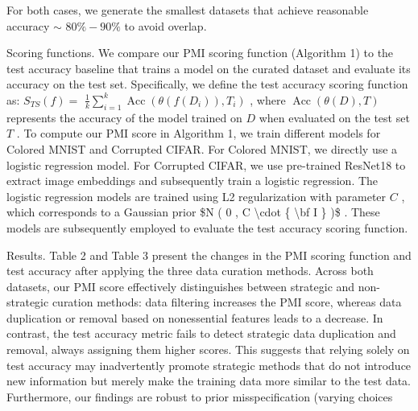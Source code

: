 For both cases, we generate the smallest datasets that achieve
reasonable accuracy \(\sim\) \(8 0 \% - 9 0 \%\) to avoid overlap.

Scoring functions. We compare our PMI scoring function (Algorithm 1) to
the test accuracy baseline that trains a model on the curated dataset
and evaluate its accuracy on the test set. Specifically, we define the
test accuracy scoring function as: \(S _ { T S } ( f ) =\)
\({ \frac { 1 } { k } } \sum _ { i = 1 } ^ { k } \operatorname { A c c } ( \theta ( f ( D _ { i } ) ) , T _ { i } )\)
, where \(\operatorname { A c c } ( \theta ( D ) , T )\) represents the
accuracy of the model trained on \(D\) when evaluated on the test set
\(T\) . To compute our PMI score in Algorithm 1, we train different
models for Colored MNIST and Corrupted CIFAR. For Colored MNIST, we
directly use a logistic regression model. For Corrupted CIFAR, we use
pre-trained ResNet18 to extract image embeddings and subsequently train
a logistic regression. The logistic regression models are trained using
L2 regularization with parameter \(C\) , which corresponds to a Gaussian
prior {\$N ( 0 , C \textbackslash cdot \{ \textbackslash bf I \} )\$} .
These models are subsequently employed to evaluate the test accuracy
scoring function.

Results. Table 2 and Table 3 present the changes in the PMI scoring
function and test accuracy after applying the three data curation
methods. Across both datasets, our PMI score effectively distinguishes
between strategic and non-strategic curation methods: data filtering
increases the PMI score, whereas data duplication or removal based on
nonessential features leads to a decrease. In contrast, the test
accuracy metric fails to detect strategic data duplication and removal,
always assigning them higher scores. This suggests that relying solely
on test accuracy may inadvertently promote strategic methods that do not
introduce new information but merely make the training data more similar
to the test data. Furthermore, our findings are robust to prior
misspecification (varying choices

